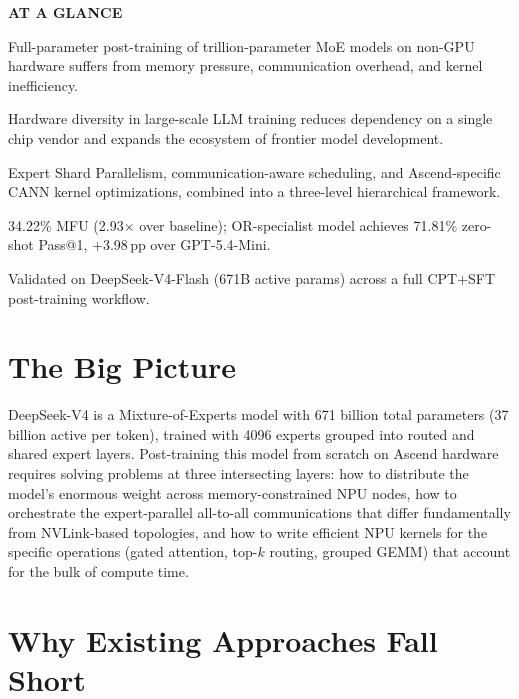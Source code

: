 \documentclass[10pt,twocolumn]{article}
\begin{document}
\begin{mdframed}[backgroundcolor=boxgray,linecolor=rulered,linewidth=1pt,
    innerleftmargin=6pt,innerrightmargin=6pt,
    innertopmargin=6pt,innerbottommargin=6pt]
\textbf{\small AT A GLANCE}\par\vspace{4pt}
\begin{description}[leftmargin=0pt,labelsep=4pt,itemsep=2pt,parsep=0pt,
    font=\small\bfseries]
  \item[Problem:] Full-parameter post-training of trillion-parameter
    MoE models on non-GPU hardware suffers from memory pressure,
    communication overhead, and kernel inefficiency.
  \item[Why it matters:] Hardware diversity in large-scale LLM
    training reduces dependency on a single chip vendor and expands
    the ecosystem of frontier model development.
  \item[Method:] Expert Shard Parallelism, communication-aware
    scheduling, and Ascend-specific CANN kernel optimizations,
    combined into a three-level hierarchical framework.
  \item[Result:] 34.22\% MFU (2.93$\times$ over baseline); OR-specialist
    model achieves 71.81\% zero-shot Pass@1, +3.98\,pp over GPT-5.4-Mini.
  \item[Evidence:] Validated on DeepSeek-V4-Flash (671B active params)
    across a full CPT+SFT post-training workflow.
\end{description}
\end{mdframed}

\section{The Big Picture}

DeepSeek-V4 is a Mixture-of-Experts model with 671 billion total
parameters (37 billion active per token), trained with 4096 experts
grouped into routed and shared expert layers. Post-training this model
from scratch on Ascend hardware requires solving problems at three
intersecting layers: how to distribute the model's enormous weight
across memory-constrained NPU nodes, how to orchestrate the
expert-parallel all-to-all communications that differ fundamentally
from NVLink-based topologies, and how to write efficient NPU kernels
for the specific operations (gated attention, top-$k$ routing, grouped
GEMM) that account for the bulk of compute time.

\section{Why Existing Approaches Fall Short}
\end{document}
